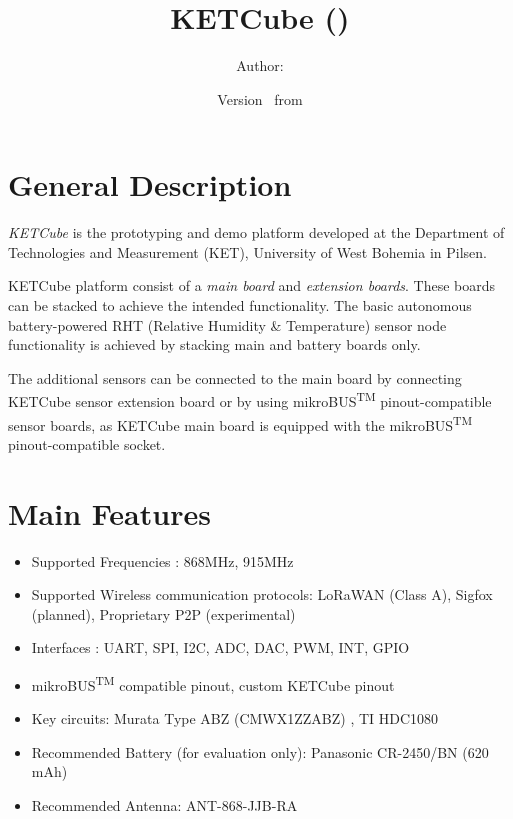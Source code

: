 \documentclass[twoside,a4paper]{refart}
\title{\UWBLogo KETCube (\vhCurrentVersion)}
\author{Author: \vhListAllAuthorsLongWithAbbrev}
\date{Version \vhCurrentVersion\ from \vhCurrentDate}
\begin{document}

\titlepage
\maketitle

\section*{General Description}
%
{\it KETCube} is the prototyping and demo platform developed at the Department of Technologies and Measurement (KET), University of West Bohemia in Pilsen. 

KETCube platform consist of a {\it main board} and {\it extension boards}.
These boards can be stacked to achieve the intended functionality. The basic autonomous battery-powered RHT (Relative Humidity \& Temperature) sensor node functionality is achieved by stacking main and battery boards only. 

The additional sensors can be connected to the main board by connecting KETCube sensor extension board or by using mikroBUS\textsuperscript{TM} pinout-compatible sensor boards, as KETCube main board is equipped with the mikroBUS\textsuperscript{TM} pinout-compatible socket.



\section*{Main Features}
\begin{itemize}
  \item Supported Frequencies \cite{Murata:ABZ}: 868MHz, 915MHz
  \item Supported Wireless communication protocols: LoRaWAN (Class A), Sigfox (planned), Proprietary P2P (experimental)
  \item Interfaces \cite{Murata:ABZ}: UART, SPI, I2C, ADC, DAC, PWM, INT, GPIO
  \item mikroBUS\textsuperscript{TM} compatible pinout, custom KETCube pinout
  \item Key circuits: Murata Type ABZ (CMWX1ZZABZ) \cite{Murata:ABZ}, TI HDC1080 \cite{TI:HDC1080}
  \item Recommended Battery (for evaluation only): Panasonic CR-2450/BN (620 mAh)
  \item Recommended Antenna: ANT-868-JJB-RA
\end{itemize}
\setcounter{tocdepth}{1}
\tableofcontents
\clearpage
\end{document}
